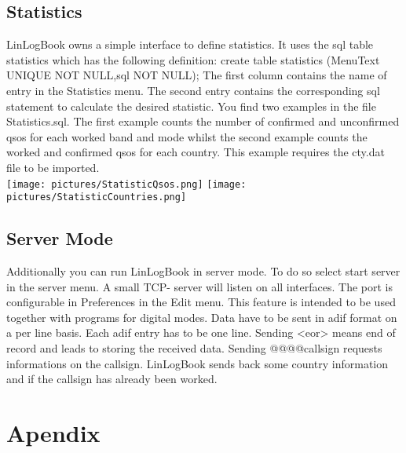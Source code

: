 \documentclass[a4paper,11pt]{article}
\begin{document}
\subsection{Statistics}
LinLogBook owns a simple interface to define statistics. It uses the sql table
statistics which has the following definition:
create table statistics (MenuText UNIQUE NOT NULL,sql NOT NULL);
The first column contains the name of entry in the Statistics menu. The second
entry contains the corresponding sql statement to calculate the desired statistic.
You find two examples in the file Statistics.sql. The first example counts
the number of confirmed and unconfirmed qsos for each worked band and mode
whilst the second example counts the worked and confirmed qsos for each country.
 This example requires the cty.dat file to be imported.\\

\texttt{[image: pictures/StatisticQsos.png]}
\texttt{[image: pictures/StatisticCountries.png]}
\subsection{Server Mode}
Additionally you can run LinLogBook in server mode. To do so select start
server in the server menu. A small TCP- server will listen on all interfaces. The
port is configurable in Preferences in the Edit menu. This feature is intended
to be used together with programs for digital modes.
Data have to be sent in adif format on a per line basis. Each adif entry has
to be one line. Sending <eor> means end of record and leads to storing the
received data.
Sending @@@@callsign requests informations on the callsign. LinLogBook
sends back some country information and if the callsign has already been worked.
\section{Apendix}
\end{document}
